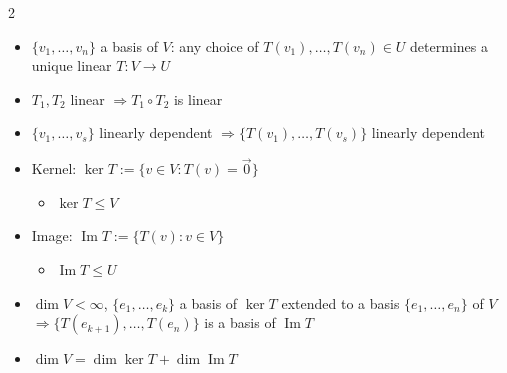 \documentclass[fleqn]{article}
\begin{document}
\begin{multicols}{2}
\begin{itemize}
\item $\{v_1,\dots,v_n\}$ a basis of $V$: any choice of $T(v_1),\dots,T(v_n) \in U$ determines a unique linear $T:V \to U$
\item $T_1,T_2$ linear $\Rightarrow T_1 \circ T_2$ is linear
\item $\{v_1,\dots,v_s\}$ linearly dependent $\Rightarrow \{T(v_1),\dots,T(v_s)\}$ linearly dependent
\item Kernel: $\ker T := \{v \in V : T(v)=\vec{0}\}$
\begin{itemize}
\item $\ker T \le V$
\end{itemize}
\item Image: $\operatorname{Im} T := \{T(v) : v \in V\}$
\begin{itemize}
\item $\operatorname{Im} T \le U$
\end{itemize}
\item $\dim V<\infty$, $\{e_1,\dots,e_k\}$ a basis of $\ker T$ extended to a basis $\{e_1,\dots,e_n\}$ of $V$ $\Rightarrow \{T(e_{k+1}),\dots,T(e_n)\}$ is a basis of $\operatorname{Im}T$
\item $\dim V = \dim \ker T + \dim \operatorname{Im}T$
\end{itemize}


\end{multicols}
\end{document}
